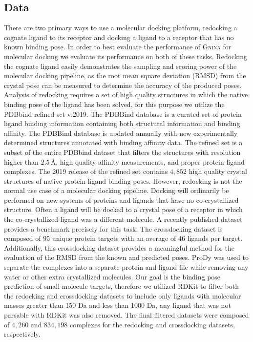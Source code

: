 \documentclass[journal=jcisd8,manuscript=article]{achemso}
\begin{document}
\subsection{Data}
There are two primary ways to use a molecular docking platform, redocking a cognate ligand to its receptor and docking a ligand to a receptor that has no known binding pose. In order to best evaluate the performance of \textsc{Gnina} for molecular docking we evaluate its performance on both of these tasks. Redocking the cognate ligand easily demonstrates the sampling and scoring power of the molecular docking pipeline, as the root mean square deviation (RMSD) from the crystal pose can be measured to determine the accuracy of the produced poses. Analysis of redocking requires a set of high quality structures in which the native binding pose of the ligand has been solved, for this purpose we utilize the PDBbind refined set v.2019. The PDBBind database is a curated set of protein ligand binding information containing both structural information and binding affinity. The PDBBind database is updated annually with new experimentally determined structures annotated with binding affinity data. The refined set is a subset of the entire PDBbind dataset that filters the structures with resolution higher than $2.5\,$\AA, high quality affinity measurements, and proper protein-ligand complexes. The 2019 release of the refined set contains $4,852$ high quality crystal structures of native protein-ligand binding poses. However, redocking is not the normal use case of a molecular docking pipeline. Docking will ordinarily be performed on new systems of proteins and ligands that have no co-crystallized structure. Often a ligand will be docked to a crystal pose of a receptor in which the co-crystallized ligand was a different molecule. A recently published dataset provides a benchmark precisely for this task\cite{wierbowski2020cross}. The crossdocking dataset is composed of $95$ unique protein targets with an average of $46$ ligands per target. Additionally, this crossdocking dataset provides a meaningful method for the evaluation of the RMSD from the known and predicted poses. ProDy\cite{bakan2011prody} was used to separate the complexes into a separate protein and ligand file while removing any water or other extra crystallized molecules. Our goal is the binding pose prediction of small molecule targets, therefore we utilized RDKit\cite{rdkit} to filter both the redocking and crossdocking datasets to include only ligands with molecular masses greater than 150 Da and less than 1000 Da, any ligand that was not parsable with RDKit was also removed. The final filtered datasets were composed of $4,260$ and $834,198$ complexes for the redocking and crossdocking datasets, respectively.
\end{document}
